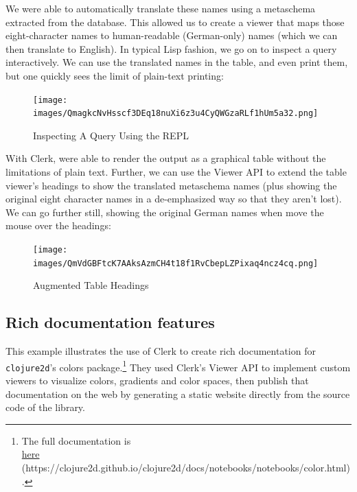 \documentclass[sigconf,screen,pbalance=true]{acmart}
\newcommand{\passthrough}[1]{#1}
\begin{document}
We were able to automatically translate these names using a metaschema extracted from the database. This allowed us to create a viewer that maps those eight-character names to human-readable (German-only) names (which we can then translate to English). In typical Lisp fashion, we go on to inspect a query interactively. We can use the translated names in the table, and even print them, but one quickly sees the limit of plain-text printing:

\begin{figure}
\hypertarget{inspecting-a-query-using-the-repl}{%
\centering
\texttt{[image: images/QmagkcNvHsscf3DEq18nuXi6z3u4CyQWGzaRLf1hUm5a32.png]}
\caption{Inspecting A Query Using the REPL}\label{inspecting-a-query-using-the-repl}
}
\end{figure}

With Clerk, were able to render the output as a graphical table without the limitations of plain text. Further, we can use the Viewer API to extend the table viewer's headings to show the translated metaschema names (plus showing the original eight character names in a de-emphasized way so that they aren't lost). We can go further still, showing the original German names when move the mouse over the headings:

\begin{figure}
\hypertarget{augmented-table-headings}{%
\centering
\texttt{[image: images/QmVdGBFtcK7AAksAzmCH4t18f1RvCbepLZPixaq4ncz4cq.png]}
\caption{Augmented Table Headings}\label{augmented-table-headings}
}
\end{figure}

\hypertarget{rich-documentation-features}{%
\subsection{Rich documentation features}\label{rich-documentation-features}}

This example illustrates the use of Clerk to create rich documentation for \passthrough{\lstinline!clojure2d!}'s colors package.\footnote{The full documentation is\\
  {\href{https://clojure2d.github.io/clojure2d/docs/notebooks/notebooks/color.html}{here} (https://clojure2d.github.io/clojure2d/docs/notebooks/notebooks/color.html)}.} They used Clerk's Viewer API to implement custom viewers to visualize colors, gradients and color spaces, then publish that documentation on the web by generating a static website directly from the source code of the library.
\end{document}
